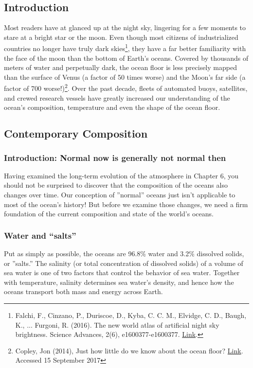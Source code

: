 \subsection{Introduction}
Most readers have at glanced up at the night sky, lingering for a few moments to stare at a bright star or the moon. Even though most citizens of industrialized countries no longer have truly dark skies\footnote{Falchi, F., Cinzano, P., Duriscoe, D., Kyba, C. C. M., Elvidge, C. D., Baugh, K., ... Furgoni, R. (2016). The new world atlas of artificial night sky brightness. Science Advances, 2(6), e1600377-e1600377. \href{https://doi.org/10.1126/sciadv.1600377}{Link}.}, they have a far better familiarity with the face of the moon than the bottom of Earth's oceans. Covered by thousands of meters of water and perpetually dark, the ocean floor is less precisely mapped than the surface of Venus (a factor of 50 times worse) and the Moon's far side (a factor of 700 worse!)\footnote{Copley, Jon (2014), Just how little do we know about the ocean floor? \href{https://theconversation.com/just-how-little-do-we-know-about-the-ocean-floor-32751}{Link}. Accessed 15 September 2017}. Over the past decade, fleets of automated buoys, satellites, and crewed research vessels have greatly increased our understanding of the ocean's composition, temperature and even the shape of the ocean floor. 
\subsection{Contemporary Composition}
\subsubsection{Introduction: Normal now is generally not normal then}
Having examined the long-term evolution of the atmosphere in Chapter 6, you should not be surprised to discover that the composition of the oceans also changes over time. Our conception of ''normal'' oceans just isn't applicable to most of the ocean's history! But before we examine those changes, we need a firm foundation of the current composition and state of the world's oceans.

\subsubsection{Water and ``salts''}
Put as simply as possible, the oceans are 96.8\% water and 3.2\% dissolved solids, or ''salts.'' The salinity (or total concentration of dissolved solids) of a volume of sea water is one of two factors that control the behavior of sea water. Together with temperature, salinity determines sea water's density, and hence how the oceans transport both mass and energy across Earth.    
